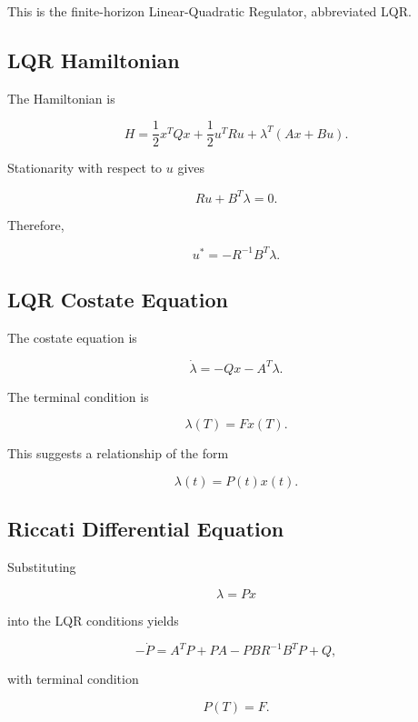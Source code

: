 This is the finite-horizon Linear-Quadratic Regulator, abbreviated LQR.

\subsection{LQR Hamiltonian}
\label{subsec:lqr-hamiltonian}

The Hamiltonian is

\[
\boxed{
H
=
\frac12x^TQx
+
\frac12u^TRu
+
\lambda^T
(
Ax+Bu
).
}
\]

Stationarity with respect to \(u\) gives

\[
Ru
+
B^T\lambda
=
0.
\]

Therefore,

\[
\boxed{
u^*
=
-
R^{-1}B^T\lambda.
}
\]

\subsection{LQR Costate Equation}
\label{subsec:lqr-costate}

The costate equation is

\[
\dot{\lambda}
=
-
Qx
-
A^T\lambda.
\]

The terminal condition is

\[
\boxed{
\lambda(T)
=
Fx(T).
}
\]

This suggests a relationship of the form

\[
\boxed{
\lambda(t)
=
P(t)x(t).
}
\]

\subsection{Riccati Differential Equation}
\label{subsec:riccati-differential-equation}

Substituting

\[
\lambda=Px
\]

into the LQR conditions yields

\[
\boxed{
-\dot{P}
=
A^TP
+
PA
-
PBR^{-1}B^TP
+
Q,
}
\]

with terminal condition

\[
\boxed{
P(T)=F.
}
\]


